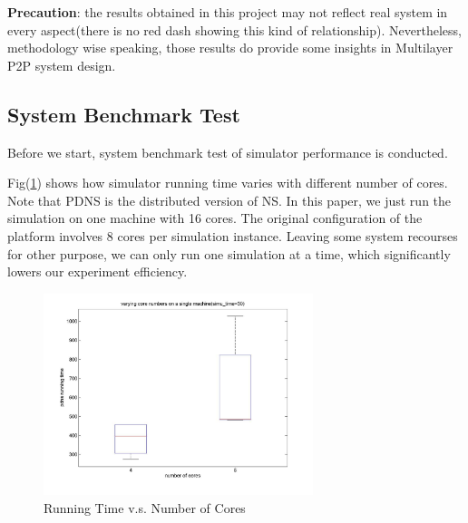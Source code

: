 \documentclass[11pt,a4paper]{article}
\begin{document}
\textbf{Precaution}: the results obtained in this project may not 
reflect real system in every aspect(there is no red dash showing 
this kind of relationship). Nevertheless, methodology wise speaking, 
those results do provide some insights in Multilayer P2P system design.  




\subsection{System Benchmark Test}

Before we start, system benchmark test of simulator performance
is conducted. 


Fig(\ref{fig:simu_bm_rt_core}) shows how simulator running time 
varies with different number of cores. Note that PDNS \cite{pdns}
is the distributed version of NS\cite{ns}. In this paper, we 
just run the simulation on one machine with 16 cores. The original 
configuration of the platform involves 8 cores per simulation instance. 
Leaving some system recourses for other purpose, we can only 
run one simulation at a time, which significantly lowers our 
experiment efficiency. 

\begin{figure}[htb]
\centering
	\includegraphics[width=0.7\textwidth]{../fig/runtime_vs_core.jpg}
	\caption{Running Time v.s. Number of Cores}
	\label{fig:simu_bm_rt_core}
\end{figure}
\end{document}
